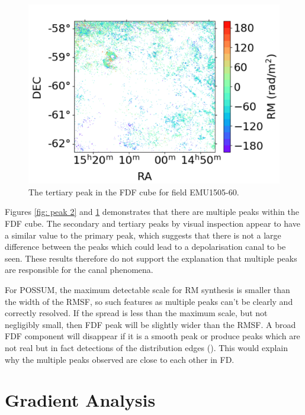 \begin{figure}
    \centering
    \includegraphics[width=\linewidth]{Thesis_Template/Figures/Peak 3.png}
    \caption{The tertiary peak in the FDF cube for field EMU1505-60.}
    \label{fig: peak 3}
\end{figure}

Figures \ref{fig: peak 2} and \ref{fig: peak 3} demonstrates that there are multiple peaks within the FDF cube. The secondary and tertiary peaks by visual inspection appear to have a similar value to the primary peak, which suggests that there is not a large difference between the peaks which could lead to a depolarisation canal to be seen. These results therefore do not support the explanation that multiple peaks are responsible for the canal phenomena.

For POSSUM, the maximum detectable scale for RM synthesis is smaller than the width of the RMSF, so such features as multiple peaks can't be clearly and correctly resolved. If the spread is less than the maximum scale, but not negligibly small, then FDF peak will be slightly wider than the RMSF. A broad FDF component will disappear if it is a smooth peak or produce peaks which are not real but in fact detections of the distribution edges (\cite{Erceg_2022}). This would explain why the multiple peaks observed are close to each other in FD.

\section{Gradient Analysis}
\label{grad analysis}

